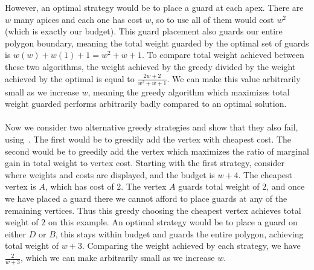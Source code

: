 However, an optimal strategy would be to place a guard at each apex. There are $w$ many apices and each one has cost $w$, so to use all of them would cost $w^2$ (which is exactly our budget). This guard placement also guards our entire polygon boundary, meaning the total weight guarded by the optimal set of guards is $w(w)+w(1)+1=w^2+w+1$. To compare total weight achieved between these two algorithms, the weight achieved by the greedy divided by the weight achieved by the optimal is equal to $\frac{2w+2}{w^2+w+1}$. We can make this value arbitrarily small as we increase $w$, meaning the greedy algorithm which maximizes total weight guarded performs arbitrarily badly compared to an optimal solution.\\\\
Now we consider two alternative greedy strategies and show that they also fail, using~. The first would be to greedily add the vertex with cheapest cost. The second would be to greedily add the vertex which maximizes the ratio of marginal gain in total weight to vertex cost. Starting with the first strategy, consider~ where weights and costs are displayed, and the budget is $w+4$. The cheapest vertex is $A$, which has cost of $2$. The vertex $A$ guards total weight of $2$, and once we have placed a guard there we cannot afford to place guards at any of the remaining vertices. Thus this greedy choosing the cheapest vertex achieves total weight of $2$ on this example. An optimal strategy would be to place a guard on either $D$ or $B$, this stays within budget and guards the entire polygon, achieving total weight of $w+3$. Comparing the weight achieved by each strategy, we have $\frac{2}{w+3}$, which we can make arbitrarily small as we increase $w$.\\\\
